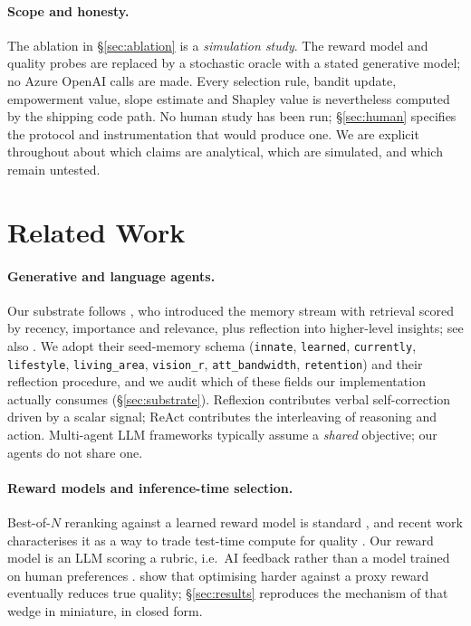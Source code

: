 \documentclass[11pt]{article}
\newcommand{\code}[1]{\texttt{\small #1}}
\theoremstyle{plain}
\theoremstyle{definition}
\begin{document}
\paragraph{Scope and honesty.}
The ablation in \S\ref{sec:ablation} is a \emph{simulation study}. The reward
model and quality probes are replaced by a stochastic oracle with a stated
generative model; no Azure OpenAI calls are made. Every selection rule, bandit
update, empowerment value, slope estimate and Shapley value is nevertheless
computed by the shipping code path. No human study has been run;
\S\ref{sec:human} specifies the protocol and instrumentation that would produce
one. We are explicit throughout about which claims are analytical, which are
simulated, and which remain untested.

\section{Related Work}
\paragraph{Generative and language agents.}
Our substrate follows \citet{park2023generative}, who introduced the memory
stream with retrieval scored by recency, importance and relevance, plus
reflection into higher-level insights; see also \citet{park2022social}. We adopt
their seed-memory schema (\code{innate}, \code{learned}, \code{currently},
\code{lifestyle}, \code{living\_area}, \code{vision\_r}, \code{att\_bandwidth},
\code{retention}) and their reflection procedure, and we audit which of these
fields our implementation actually consumes (\S\ref{sec:substrate}). Reflexion
\citep{shinn2023reflexion} contributes verbal self-correction driven by a
scalar signal; ReAct \citep{yao2023react} contributes the interleaving of
reasoning and action. Multi-agent LLM frameworks
\citep{li2023camel,hong2024metagpt,wu2024autogen,du2024debate} typically assume
a \emph{shared} objective; our agents do not share one.

\paragraph{Reward models and inference-time selection.}
Best-of-$N$ reranking against a learned reward model is standard
\citep{nakano2021webgpt,cobbe2021training}, and recent work characterises it as
a way to trade test-time compute for quality \citep{snell2025scaling}. Our
reward model is an LLM scoring a rubric, i.e.\ AI feedback
\citep{bai2022constitutional,lee2024rlaif} rather than a model trained on human
preferences \citep{christiano2017deep,stiennon2020learning,ouyang2022training}.
\citet{gao2023scaling} show that optimising harder against a proxy reward
eventually reduces true quality; \S\ref{sec:results} reproduces the mechanism of
that wedge in miniature, in closed form.
\end{document}
